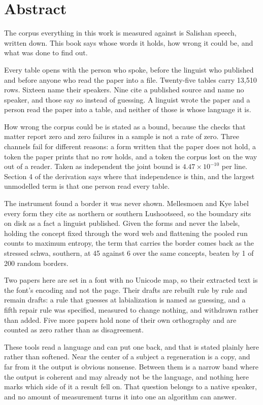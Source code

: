 \chapter*{Abstract}

The corpus everything in this work is measured against is Salishan speech, written down. This book
says whose words it holds, how wrong it could be, and what was done to find out.

Every table opens with the person who spoke, before the linguist who published and before anyone who
read the paper into a file. Twenty-five tables carry 13,510 rows. Sixteen name their speakers. Nine
cite a published source and name no speaker, and those say so instead of guessing. A linguist wrote
the paper and a person read the paper into a table, and neither of those is whose language it is.

How wrong the corpus could be is stated as a bound, because the checks that matter report
zero and zero failures in a sample is not a rate of zero. Three channels fail for different reasons:
a form written that the paper does not hold, a token the paper prints that no row holds, and a token
the corpus lost on the way out of a reader. Taken as independent the joint bound is
$4.47 \times 10^{-10}$ per line. Section 4 of the derivation says where that independence is thin,
and the largest unmodelled term is that one person read every table.

The instrument found a border it was never shown. Mellesmoen and Kye label every form they cite as
northern or southern Lushootseed, so the boundary sits on disk as a fact a linguist published. Given
the forms and never the labels, holding the concept fixed through the word web and flattening the
pooled run counts to maximum entropy, the term that carries the border comes back as the stressed
schwa, southern, at 45 against 6 over the same concepts, beaten by 1 of 200 random borders.

Two papers here are set in a font with no Unicode map, so their extracted text is the font's encoding
and not the page. Their drafts are rebuilt rule by rule and remain drafts: a rule that guesses at
labialization is named as guessing, and a fifth repair rule was specified, measured to change nothing,
and withdrawn rather than added. Five more papers hold none of their own orthography and are counted
as zero rather than as disagreement.

These tools read a language and can put one back, and that is stated plainly here rather than
softened. Near the center of a subject a regeneration is a copy, and far from it the output is
obvious nonsense. Between them is a narrow band where the output is coherent and may already not be
the language, and nothing here marks which side of it a result fell on. That question belongs to a
native speaker, and no amount of measurement turns it into one an algorithm can answer.
\cleardoublepage
